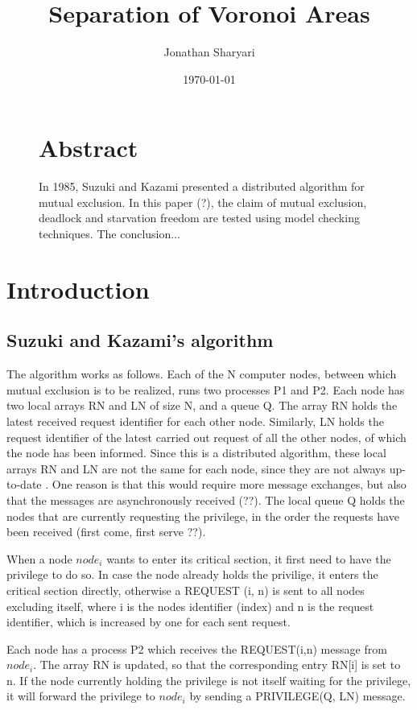 \documentclass[a4paper,12pt]{article}
\title{\textbf{Separation of Voronoi Areas}}
\author{Jonathan Sharyari}  %
\date{\today}
\begin{document}
\maketitle

\begin{figure}
\section*{\large Abstract}
In 1985, Suzuki and Kazami presented a distributed algorithm for mutual exclusion. In this paper (?), the claim of mutual exclusion, deadlock and starvation freedom are tested using model checking techniques. The conclusion...
\end{figure}
\newpage

\section{Introduction}
\subsection{Suzuki and Kazami's algorithm}

The algorithm works as follows. Each of the N computer nodes, between which mutual exclusion is to be realized, runs two processes P1 and P2.
Each node has two local arrays RN and LN of size N, and a queue Q. The array RN holds the latest received request identifier for each other node. Similarly, LN holds the request identifier of the latest carried out request of all the other nodes, of which the node has been informed. Since this is a distributed algorithm, these local arrays RN and LN are not the same for each node, since they are not always up-to-date . One reason is that this would require more message exchanges, but also that the messages are asynchronously received (??).
The local queue Q holds the nodes that are currently requesting the privilege, in the order the requests have been received (first come, first serve ??).

When a node $node_i$ wants to enter its critical section, it first need to have the privilege to do so. In case the node already holds the privilige, it enters the critical section directly, otherwise a REQUEST (i, n) is sent to all nodes excluding itself, where i is the nodes identifier (index) and n is the request identifier, which is increased by one for each sent request.

Each node has a process P2 which receives the REQUEST(i,n) message from $node_i$. The array RN is updated, so that the corresponding entry RN[i] is set to n. If the node currently holding the privilege is not itself waiting for the privilege, it will forward the privilege to $node_i$ by sending a PRIVILEGE(Q, LN) message.
\end{document}
